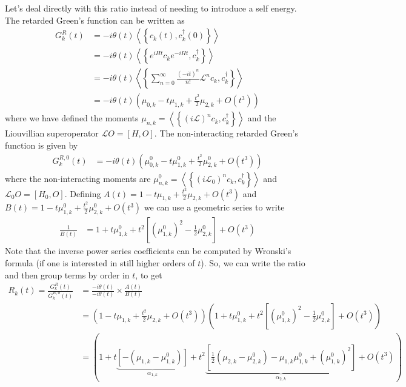  Let's deal directly with this ratio instead of needing to introduce a self energy.
The retarded Green's function can be written as
\begin{align}
G_k^R(t)&=-i \theta(t)\left\langle\left\{c_k(t), c_k^{\dagger}(0)\right\}\right\rangle \\
&=-i \theta(t)\left\langle\left\{e^{i H t} c_k e^{-i H t}, c_k^{\dagger}\right\}\right\rangle \\
&=-i \theta(t)\left\langle\left\{\sum_{n=0}^{\infty} \frac{(-i t)^n}{n!} \mathcal{L}^n c_k, c_k^{\dagger}\right\}\right\rangle \\
&=-i \theta(t)\left( \mu_{0,k}- t\mu_{1,k}+\frac{t^2}{2}\mu_{2,k}+O(t^3) \right)
\end{align}
where we have defined the moments $\mu_{n,k}=\left\langle\left\{\left(i \mathcal{L} \right)^n c_k, c_k^{\dagger}\right\}\right\rangle$ and the Liouvillian superoperator $\mathcal{L} O=[H,O]$. The non-interacting retarded Green's function is given by
\begin{align}
G_k^{R,0}(t)&=-i \theta(t)\left( \mu_{0,k}^0- t\mu_{1,k}^0+\frac{t^2}{2}\mu_{2,k}^0+O(t^3) \right)
\end{align}
where the non-interacting moments are $\mu_{n,k}^0=\left\langle\left\{\left( i \mathcal{L}_0\right)^n c_k, c_k^{\dagger}\right\}\right\rangle$ and $\mathcal{L}_0 O=[H_0,O]$. Defining $A(t)= 1-t\mu_{1,k}+\frac{t^2}{2}\mu_{2,k}+O(t^3)$ and $B(t)= 1- t\mu_{1,k}^0+\frac{t^2}{2}\mu_{2,k}^0+O(t^3)$ we can use a geometric series to write
\begin{align}
\frac{1}{B(t)}&=1+ t \mu_{1, k}^0+t^2\left[\left(\mu_{1, k}^0\right)^2-\frac{1}{2}\mu_{2, k}^0\right]+O\left(t^3\right)
\end{align}
Note that the inverse power series coefficients can be computed by Wronski's formula (if one is interested in still higher orders of $t$).
So, we can write the ratio and then group terms by order in $t$, to get
\begin{align}
R_k(t)=\frac{G_k^R(t)}{G_k^{R,0}(t)}
&=\frac{-i\theta (t)}{-i\theta (t)}\times\frac{A(t)}{B(t)} \\
&= \left( 1- t\mu_{1,k}+\frac{t^2}{2}\mu_{2,k}+O(t^3) \right) \left( 1+ t \mu_{1, k}^0+t^2\left[\left(\mu_{1, k}^0\right)^2-\frac{1}{2}\mu_{2, k}^0\right]+O\left(t^3\right) \right)\\
&= \left( 1+t\underbrace{\left[-\left(\mu_{1,k}-\mu_{1,k}^0\right)\right]}_{\alpha _{1,k}}+t^2\underbrace{\left[\frac{1}{2}\left(\mu_{2,k}-\mu_{2,k}^0\right)-\mu_{1,k}\mu_{1,k}^0+\left(\mu_{1,k}^0\right)^2\right]}_{\alpha _{2,k}}+O(t^3) \right)
\end{align}
